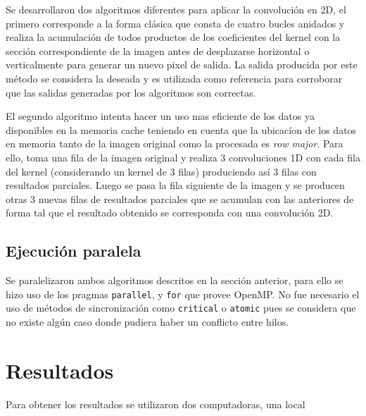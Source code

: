 \documentclass[12pt]{article}
\begin{document}
Se desarrollaron dos algoritmos diferentes para aplicar la convoluci\'on en 2D,
el primero corresponde a la forma cl\'asica que consta de cuatro bucles anidados
y realiza la acumulaci\'on de todos productos de los coeficientes del kernel con
la secci\'on correspondiente de la imagen antes de desplazarse horizontal o
verticalmente para generar un nuevo pixel de salida. La salida producida por
este m\'etodo se considera la deseada y es utilizada como referencia para
corroborar que las salidas generadas por los algoritmos son correctas.

El segundo algoritmo intenta hacer un uso mas eficiente de los datos ya
disponibles en la memoria cache teniendo en cuenta que la ubicac\'ion de los
datos en memoria tanto de la imagen original como la procesada es \textit{row
  major}. Para ello, toma una fila de la imagen original y realiza 3
convoluciones 1D con cada fila del kernel (considerando un kernel de 3 filas)
produciendo as\'i 3 filas con resultados parciales. Luego se pasa la fila
siguiente de la imagen y se producen otras 3 nuevas filas de resultados
parciales que se acumulan con las anteriores de forma tal que el resultado
obtenido se corresponda con una convoluci\'on 2D.

\subsection{Ejecuci\'on paralela}
Se paralelizaron ambos algoritmos descritos en la secci\'on anterior, para ello
se hizo uso de los pragmas \texttt{parallel}, y \texttt{for} que provee OpenMP.
No fue necesario el uso de m\'etodos de sincronizaci\'on como \texttt{critical}
o \texttt{atomic} pues se considera que no existe alg\'un caso donde pudiera
haber un conflicto entre hilos.

\section{Resultados}
Para obtener los resultados se utilizaron dos computadoras, una local
\end{document}
